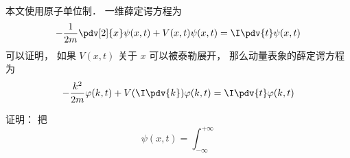 
本文使用原子单位制． 一维薛定谔方程为
\begin{equation}
-\frac{1}{2m} \pdv[2]{x}\psi(x, t) + V(x,t)\psi(x,t) = \I \pdv{t} \psi(x,t)
\end{equation}
可以证明， 如果 $V(x,t)$ 关于 $x$ 可以被泰勒展开， 那么动量表象的薛定谔方程为
\begin{equation}
-\frac{k^2}{2m}\varphi(k, t) + V(\I \pdv{k})\varphi(k, t) = \I \pdv{t} \varphi(k,t)
\end{equation}

证明： 把
\begin{equation}
\psi(x,t) = \int_{-\infty}^{+\infty}
\end{equation}
